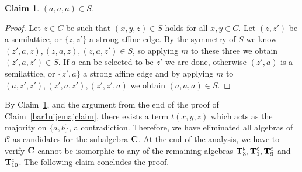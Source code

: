 \documentclass[11pt]{amsart}
\newcommand{\m}[1]{\mathbf{\uppercase{#1}}}
\newcommand{\n}{\scriptscriptstyle{\mathsf{N}}}
\newcommand{\co}{\scriptscriptstyle{\mathsf{C}}}
\theoremstyle{definition}
\theoremstyle{remark}
\theoremstyle{plain}
\newtheorem{claim}[thm]{Claim}
\begin{document}
\begin{claim}\label{majorityexists}
$(a,a,a)\in S$.
\end{claim}
\begin{proof}
Let $z\in C$ be such that $(x,y,z)\in S$ holds for all $x,y\in C$. Let $(z,z')$ be a semilattice, or $\{z,z'\}$ a strong affine edge. By the symmetry of $S$ we know $(z',a,z),(z,a,z),(z,a,z')\in S$, so applying $m$ to these three we obtain $(z',a,z')\in S$. If $a$ can be selected to be $z'$ we are done, otherwise $(z',a)$ is a semilattice, or $\{z',a\}$ a strong affine edge and by applying $m$ to $(a,z',z'),(z',a,z'),(z',z',a)$ we obtain $(a,a,a)\in S$.
\end{proof}


By Claim~\ref{majorityexists}, and the argument from the end of the proof of Claim~\ref{bar1nijemajclaim}, there exists a term $t(x,y,z)$ which acts as the majority on $\{a,b\}$, a contradiction. Therefore, we have eliminated all algebras of $\mathcal{C}$ as candidates for the subalgebra $\m c$. At the end of the analysis, we have to verify $\m c$ cannot be isomorphic to any of the remaining algebras $\m t^{\n}_3, \m t^{\co}_1, \m t^{\co}_9$ and $\m t^{\co}_{10}$. The following claim concludes the proof.
\end{document}
